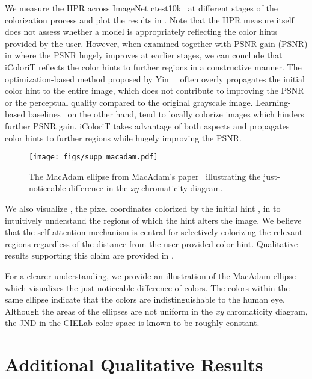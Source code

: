 \documentclass[10pt,twocolumn,letterpaper]{article}
\begin{document}
We measure the HPR across ImageNet ctest10k~\cite{ctest} at different stages of the colorization process and plot the results in . 
Note that the HPR measure itself does not assess whether a model is appropriately reflecting the color hints provided by the user. 
However, when examined together with PSNR gain (PSNR) in  where the PSNR hugely improves at earlier stages, we can conclude that iColoriT reflects the color hints to further regions in a constructive manner. 
The optimization-based method proposed by Yin~\etal~\cite{side} often overly propagates the initial color hint to the entire image, which does not contribute to improving the PSNR or the perceptual quality compared to the original grayscale image. 
Learning-based baselines~\cite{zhang2017, instanceaware} on the other hand, tend to locally colorize images which hinders further PSNR gain. 
iColoriT takes advantage of both aspects and propagates color hints to further regions while hugely improving the PSNR. 

 \begin{figure}[t]
\centering
    \texttt{[image: figs/supp\_macadam.pdf]}
\caption{The MacAdam ellipse from MacAdam's paper~\cite{macadam} illustrating the just-noticeable-difference in the \textit{xy} chromaticity diagram.}
    \vspace{-0.5cm}
 \end{figure}

We also visualize , the pixel coordinates colorized by the initial hint , in  to intuitively understand the regions of which the hint alters the image. We believe that the self-attention mechanism is central for selectively colorizing the relevant regions regardless of the distance from the user-provided color hint. 
Qualitative results supporting this claim are provided in . 


For a clearer understanding, we provide an illustration of the MacAdam ellipse which visualizes the just-noticeable-difference of colors. 
The colors within the same ellipse indicate that the colors are indistinguishable to the human eye.
Although the areas of the ellipses are not uniform in the \textit{xy} chromaticity diagram, the JND in the CIELab color space is known to be roughly constant. 

\vspace{-0.2cm}
\section{Additional Qualitative Results}
\label{sec:sup_quali}
\end{document}
